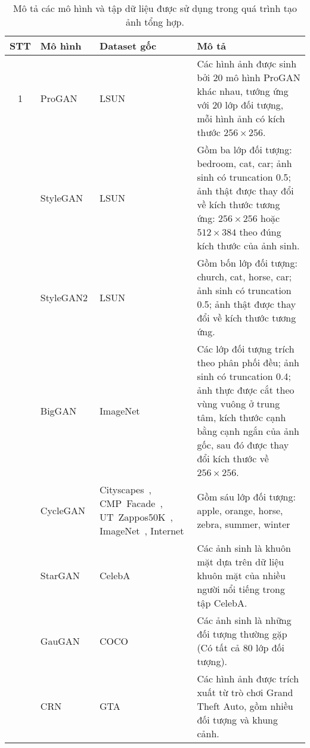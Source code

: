 \begin{table}[ht!]
	\centering
	\caption{Mô tả các mô hình và tập dữ liệu được sử dụng trong quá trình tạo ảnh tổng hợp.}
	\label{tab:synthetic_dataset_summary}
	\begin{adjustbox}{max width=\textwidth}
		\renewcommand{\arraystretch}{1.5}
		\setlength{\tabcolsep}{10pt}
		\begin{tabular}{c p{2cm} p{3cm} p{8.5cm}}
			\toprule
			\textbf{STT} & \textbf{Mô hình} & \textbf{Dataset gốc} & \textbf{Mô tả} \\
			\midrule
			1 & ProGAN~\cite{karras2018progressive} & LSUN~\cite{Yu2015LSUNCO} & Các hình ảnh được sinh bởi 20 mô hình ProGAN khác nhau, tướng ứng với 20 lớp đối tượng, mỗi hình ảnh có kích thước  $256 \times 256$. \\
			\hdashline
			2 & StyleGAN~\cite{karras2019style} & LSUN~\cite{Yu2015LSUNCO} & Gồm ba lớp đối tượng: bedroom, cat, car; ảnh sinh có truncation 0.5; ảnh thật được thay đổi về kích thước tương ứng: $256 \times 256$ hoặc $512 \times 384$ theo đúng kích thước của ảnh sinh. \\
			\hdashline
			3 & StyleGAN2\cite{Karras2019AnalyzingAI} & LSUN~\cite{Yu2015LSUNCO} & Gồm bốn lớp đối tượng: church, cat, horse, car; ảnh sinh có truncation 0.5; ảnh thật được thay đổi về kích thước tương ứng. \\
			\hdashline
			4 & BigGAN~\cite{brock2018large} & ImageNet~\cite{5206848} & Các lớp đối tượng trích theo phân phối đều; ảnh sinh có truncation 0.4; ảnh thực được cắt theo vùng vuông ở trung tâm, kích thước cạnh bằng cạnh ngắn của ảnh gốc, sau đó được thay đổi kích thước về $256 \times 256$. \\
			\hdashline
			5 & CycleGAN~\cite{zhu2017unpaired} & Cityscapes~\cite{Cordts2016Cityscapes}, CMP~Facade~\cite{Tylecek13}, UT~Zappos50K~\cite{6909426}, ImageNet~\cite{5206848}, Internet & Gồm sáu lớp đối tượng: apple, orange, horse, zebra, summer, winter\\
			\hdashline
			6 & StarGAN~\cite{choi2018stargan} & CelebA~\cite{liu2015faceattributes} & Các ảnh sinh là khuôn mặt dựa trên dữ liệu khuôn mặt của nhiều người nổi tiếng trong tập CelebA.\\
			\hdashline
			7 & GauGAN~\cite{park2019SPADE} & COCO~\cite{lin2014microsoft} & Các ảnh sinh là những đối tượng thường gặp (Có tất cả 80 lớp đối tượng). \\
			\hdashline
			8 & CRN~\cite{chen2017photographic} & GTA~\cite{barua2025gta} & Các hình ảnh được trích xuất từ trò chơi Grand Theft Auto, gồm nhiều đối tượng và khung cảnh. \\

\end{tabular}
\end{adjustbox}
\end{table}
